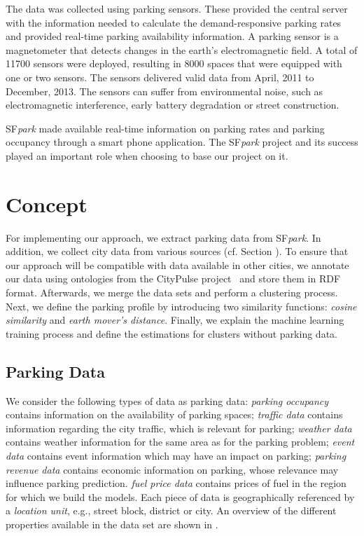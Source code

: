 The data was collected using parking sensors. These provided the central server with the information needed to calculate the demand-responsive parking rates and provided real-time parking availability information. A parking sensor is a magnetometer that detects changes in the earth's electromagnetic field. A total of 11700 sensors were deployed, resulting in 8000 spaces that were equipped with one or two sensors. The sensors delivered valid data from April, 2011 to December, 2013. The sensors can suffer from environmental noise, such as electromagnetic interference, early battery degradation or street construction. 

SF\textit{park} made available real-time information on parking rates and parking occupancy through a smart phone application. The SF\textit{park} project and its success played an important role when choosing to base our project on it.

\section{Concept}
For implementing our approach, we extract parking data from SF\textit{park}. In addition, we collect city data from various sources (cf. Section ). To ensure that our approach will be compatible with data available in other cities, we annotate our data using ontologies from the CityPulse project~\cite{city_pulse} and store them in RDF format. Afterwards, we merge the data sets and perform a clustering process. Next, we define the parking profile by introducing two similarity functions: \textit{cosine similarity} and \textit{earth mover's distance}.
Finally, we explain the machine learning training process and define the estimations for clusters without parking data.


\subsection{Parking Data}
We consider the following types of data as parking data: \textit{parking occupancy} contains information on the availability of parking spaces; \textit{traffic data} contains information regarding the city traffic, which is relevant for parking; \textit{weather data} contains weather information for the same area as for the parking problem; \textit{event data} contains event information which may have an impact on parking; \textit{parking revenue data} contains economic information on parking, whose relevance may influence parking prediction. \textit{fuel price data} contains prices of fuel in the region for which we build the models.
Each piece of data is geographically referenced by a \textit{location unit}, e.g., street block, district or city. 
An overview of the different properties available in the data set are shown in .

